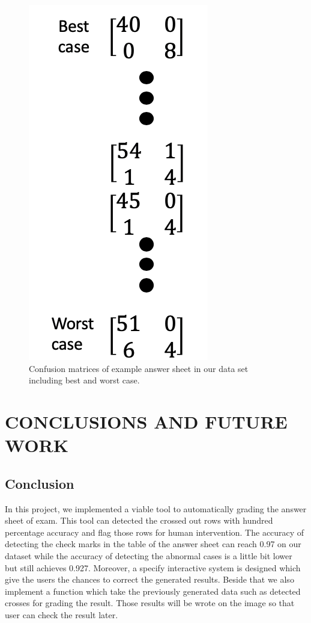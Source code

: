 \documentclass[a4paper,twoside]{article}
\begin{document}
  \begin{figure}[!h]
  \centering
  \includegraphics[width=0.4\columnwidth]{Latex/imgs/4matrix.png}
  \caption{Confusion matrices of example answer sheet in our data set including best and worst case.}
  \label{fig:class_accuracy}
 \end{figure}



\section{\uppercase{Conclusions  and future work}}
\label{sec:conclusion}
\subsection{Conclusion}
In this project, we implemented a viable tool to automatically grading the answer sheet of exam. This tool can detected the crossed out rows with hundred percentage accuracy and flag those rows for human intervention. The accuracy of detecting the check marks in the table of the answer sheet can reach 0.97 on our dataset while the accuracy of detecting the abnormal cases is a little bit lower but still achieves 0.927. Moreover, a specify interactive system is designed which give the users the chances to correct the generated results. Beside that we also implement a function which take the previously generated data such as detected crosses for grading the result. Those results will be wrote on the image so that user can check the result later. 
\end{document}
